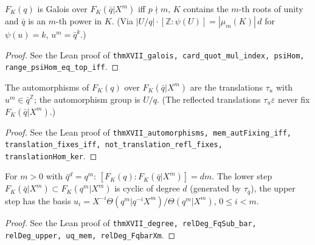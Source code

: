 \begin{theorem}
\label{thm:XVII-iv}
\leanok
$F_K(q)$ is Galois over $F_K(\bar q|X^m)$ iff $p\nmid m$, $K$ contains the $m$-th roots of unity and $\bar q$ is an $m$-th power in $K$. (Via $|U/q|\cdot[\mathbb Z:\psi(U)]=|\mu_m(K)|\,d$ for $\psi(u)=k$, $u^m=\bar q^k$.)
\end{theorem}
\begin{proof}
\leanok
See the Lean proof of \texttt{thmXVII\_galois, card\_quot\_mul\_index, psiHom, range\_psiHom\_eq\_top\_iff}.
\end{proof}

\begin{theorem}
\label{thm:XVII-iii}
\leanok
The automorphisms of $F_K(q)$ over $F_K(\bar q|X^m)$ are the translations $\tau_u$ with $u^m\in\bar q^{\mathbb Z}$; the automorphism group is $U/q$. (The reflected translations $\tau_u\varepsilon$ never fix $F_K(\bar q|X^m)$.)
\end{theorem}
\begin{proof}
\leanok
See the Lean proof of \texttt{thmXVII\_automorphisms, mem\_autFixing\_iff, translation\_fixes\_iff, not\_translation\_refl\_fixes, translationHom\_ker}.
\end{proof}

\begin{theorem}
\label{thm:XVII-i}
\leanok
For $m>0$ with $\bar q^d=q^m$: $[F_K(q):F_K(\bar q|X^m)]=dm$. The lower step $F_K(\bar q|X^m)\subset F_K(q^m|X^m)$ is cyclic of degree $d$ (generated by $\tau_{\bar q}$), the upper step has the basis $u_i=X^{-i}\Theta(q^m|q^{-i}X^m)/\Theta(q^m|X^m)$, $0\le i<m$.
\end{theorem}
\begin{proof}
\leanok
See the Lean proof of \texttt{thmXVII\_degree, relDeg\_FqSub\_bar, relDeg\_upper, uq\_mem, relDeg\_FqbarXm}.
\end{proof}

